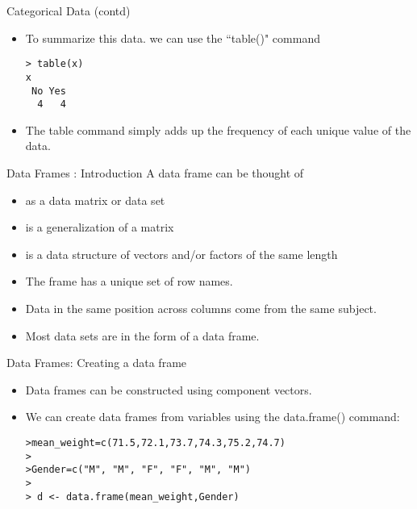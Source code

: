 \documentclass[pdf,default,slideColor,colorBG]{prosper}
\begin{document}

\begin{slide}{Categorical Data (contd)}
\begin{itemize}
\item To summarize this data. we can use the ``table()" command

\begin{verbatim}
> table(x)
x
 No Yes
  4   4
\end{verbatim}

\item The table command simply adds up the frequency of each unique value of the data.
\end{itemize}
\end{slide}





\begin{slide}{Data Frames : Introduction}
A data frame can be thought of
\begin{itemize}
\item as a data matrix or data set \item is a generalization of a
matrix \item is a data structure of vectors and/or factors of the
same length \item  The frame has a unique set of row names. \item Data in
the same position across columns come from the same subject. \item
Most data sets are in the form of a data frame.
\end{itemize}

\end{slide}

\begin{slide}{Data Frames: Creating a data frame}
\begin{itemize}
\item Data frames can be constructed using component vectors.
\item 
We can create data frames from variables using the data.frame()
command:
\begin{verbatim}
>mean_weight=c(71.5,72.1,73.7,74.3,75.2,74.7)
>
>Gender=c("M", "M", "F", "F", "M", "M")
>
> d <- data.frame(mean_weight,Gender)
\end{verbatim}
\end{itemize}
\end{slide}
\end{document}
